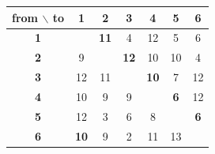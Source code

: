\begin{tabular}{c|cccccc}
from $\backslash$ to & 1 & 2 & 3 & 4 & 5 & 6\\\hline
\textbf{1} & \cellcolor{black!12} & \cellcolor{yellow!60}\textbf{11} & 4 & 12 & 5 & 6\\
\textbf{2} & 9 & \cellcolor{black!12} & \cellcolor{yellow!60}\textbf{12} & 10 & 10 & 4\\
\textbf{3} & 12 & 11 & \cellcolor{black!12} & \cellcolor{yellow!60}\textbf{10} & 7 & 12\\
\textbf{4} & 10 & 9 & 9 & \cellcolor{black!12} & \cellcolor{yellow!60}\textbf{6} & 12\\
\textbf{5} & 12 & 3 & 6 & 8 & \cellcolor{black!12} & \cellcolor{yellow!60}\textbf{6}\\
\textbf{6} & \cellcolor{yellow!60}\textbf{10} & 9 & 2 & 11 & 13 & \cellcolor{black!12}\\
\end{tabular}
